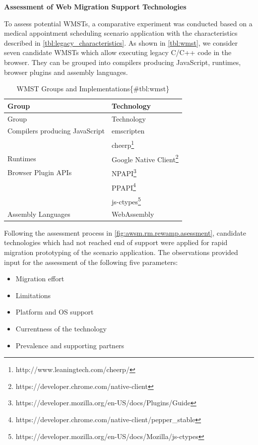 \textbf{Assessment of Web Migration Support Technologies}

To assess potential WMSTs, a comparative experiment was conducted based on a medical appointment scheduling scenario application with the characteristics described in \cref{tbl:legacy_characteristics}.
As shown in \cref{tbl:wmst}, we consider seven candidate WMSTs which allow executing legacy C/C++ code in the browser.
They can be grouped into compilers producing JavaScript, runtimes, browser plugins and assembly languages.

\begin{longtable}[]{@{}ll@{}}
\caption{WMST Groups and Implementations\{\#tbl:wmst\}}\tabularnewline
\toprule
Group & Technology\tabularnewline
\midrule
\endfirsthead
\toprule
Group & Technology\tabularnewline
\midrule
\endhead
Compilers producing JavaScript & emscripten \autocite{Zakai2011Emscripten}\tabularnewline
& cheerp\footnote{http://www.leaningtech.com/cheerp/}\tabularnewline
Runtimes & Google Native Client\footnote{https://developer.chrome.com/native-client}\tabularnewline
Browser Plugin APIs & NPAPI\footnote{https://developer.mozilla.org/en-US/docs/Plugins/Guide}\tabularnewline
& PPAPI\footnote{https://developer.chrome.com/native-client/pepper\_stable}\tabularnewline
& js-ctypes\footnote{https://developer.mozilla.org/en-US/docs/Mozilla/js-ctypes}\tabularnewline
Assembly Languages & WebAssembly \autocite{W3C2018WebAssembly}\tabularnewline
\bottomrule
\end{longtable}

Following the assessment process in \cref{fig:awsm.rm.rewamp.asessment}, candidate technologies which had not reached end of support were applied for rapid migration prototyping of the scenario application.
The observations provided input for the assessment of the following five parameters:

\begin{itemize}
\tightlist
\item
  Migration effort
\item
  Limitations
\item
  Platform and OS support
\item
  Currentness of the technology
\item
  Prevalence and supporting partners
\end{itemize}

